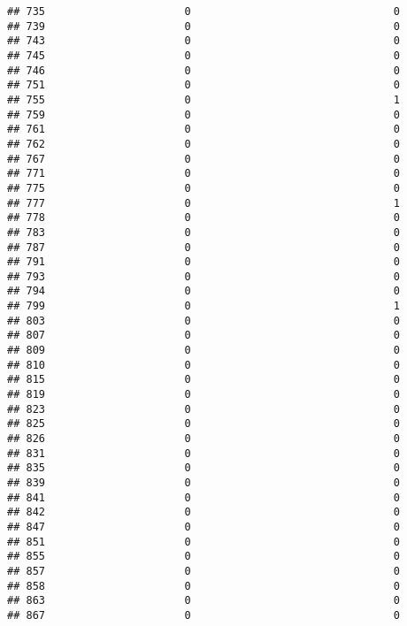\documentclass[
]{article}
\begin{document}
\begin{verbatim}
## 735                      0                                0
## 739                      0                                0
## 743                      0                                0
## 745                      0                                0
## 746                      0                                0
## 751                      0                                0
## 755                      0                                1
## 759                      0                                0
## 761                      0                                0
## 762                      0                                0
## 767                      0                                0
## 771                      0                                0
## 775                      0                                0
## 777                      0                                1
## 778                      0                                0
## 783                      0                                0
## 787                      0                                0
## 791                      0                                0
## 793                      0                                0
## 794                      0                                0
## 799                      0                                1
## 803                      0                                0
## 807                      0                                0
## 809                      0                                0
## 810                      0                                0
## 815                      0                                0
## 819                      0                                0
## 823                      0                                0
## 825                      0                                0
## 826                      0                                0
## 831                      0                                0
## 835                      0                                0
## 839                      0                                0
## 841                      0                                0
## 842                      0                                0
## 847                      0                                0
## 851                      0                                0
## 855                      0                                0
## 857                      0                                0
## 858                      0                                0
## 863                      0                                0
## 867                      0                                0

\end{verbatim}
\end{document}
